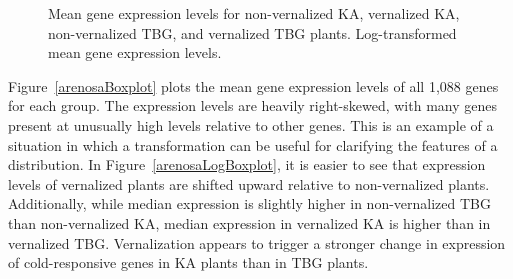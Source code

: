 \begin{figure}[h]
	\centering
	\caption{ Mean gene expression levels for non-vernalized KA, vernalized KA, non-vernalized TBG, and vernalized TBG plants.  Log-transformed mean gene expression levels.}
	\label{arenosaBoxplots}
\end{figure}

Figure~\ref{arenosaBoxplot} plots the mean gene expression levels of all 1,088 genes for each group. The expression levels are heavily right-skewed, with many genes present at unusually high levels relative to other genes. This is an example of a situation in which a transformation can be useful for clarifying the features of a distribution. In Figure~\ref{arenosaLogBoxplot}, it is easier to see that expression levels of vernalized plants are shifted upward relative to non-vernalized plants. Additionally, while median expression is slightly higher in non-vernalized TBG than non-vernalized KA, median expression in vernalized KA is higher than in vernalized TBG. Vernalization appears to trigger a stronger change in expression of cold-responsive genes in KA plants than in TBG plants.  

